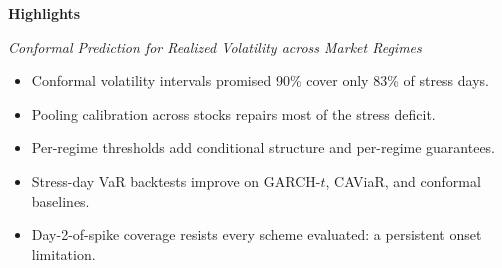 \documentclass[11pt]{article}
\begin{document}
\thispagestyle{empty}

\noindent\textbf{Highlights}

\medskip
\noindent\textit{Conformal Prediction for Realized Volatility across
Market Regimes}

\begin{itemize}
\item Conformal volatility intervals promised 90\% cover only 83\% of
  stress days.
\item Pooling calibration across stocks repairs most of the stress
  deficit.
\item Per-regime thresholds add conditional structure and per-regime
  guarantees.
\item Stress-day VaR backtests improve on GARCH-$t$, CAViaR, and
  conformal baselines.
\item Day-2-of-spike coverage resists every scheme evaluated: a
  persistent onset limitation.
\end{itemize}
\end{document}
